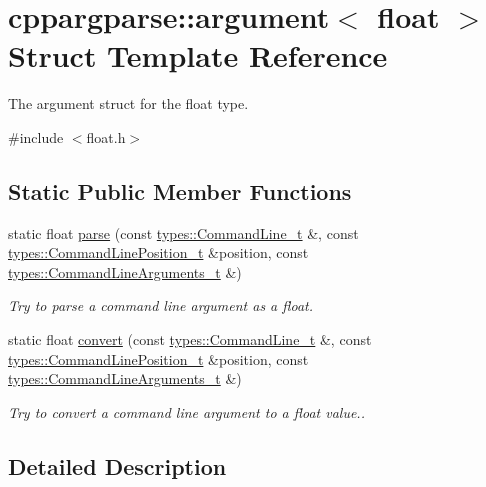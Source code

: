 \hypertarget{structcppargparse_1_1argument_3_01float_01_4}{}\section{cppargparse\+:\+:argument$<$ float $>$ Struct Template Reference}
\label{structcppargparse_1_1argument_3_01float_01_4}


The argument struct for the float type.  




{\ttfamily \#include $<$float.\+h$>$}

\subsection*{Static Public Member Functions}
\begin{DoxyCompactItemize}
\item 
static float \hyperlink{structcppargparse_1_1argument_3_01float_01_4_a6c02321d1fcc25ffa950948ab642e64f}{parse} (const \hyperlink{types_8h_a80adf2418b7ce9fe616698efa7533ecf}{types\+::\+Command\+Line\+\_\+t} \&, const \hyperlink{types_8h_a43b4f43f8940de1bf09ced6f1b668053}{types\+::\+Command\+Line\+Position\+\_\+t} \&position, const \hyperlink{types_8h_a003c660afe2ee9c6cc39aea966e8926d}{types\+::\+Command\+Line\+Arguments\+\_\+t} \&)
\begin{DoxyCompactList}\small\item\em Try to parse a command line argument as a float. \end{DoxyCompactList}\item 
static float \hyperlink{structcppargparse_1_1argument_3_01float_01_4_a3dd5dba91fc35f277138619066d7db24}{convert} (const \hyperlink{types_8h_a80adf2418b7ce9fe616698efa7533ecf}{types\+::\+Command\+Line\+\_\+t} \&, const \hyperlink{types_8h_a43b4f43f8940de1bf09ced6f1b668053}{types\+::\+Command\+Line\+Position\+\_\+t} \&position, const \hyperlink{types_8h_a003c660afe2ee9c6cc39aea966e8926d}{types\+::\+Command\+Line\+Arguments\+\_\+t} \&)
\begin{DoxyCompactList}\small\item\em Try to convert a command line argument to a float value.. \end{DoxyCompactList}\end{DoxyCompactItemize}


\subsection{Detailed Description}
